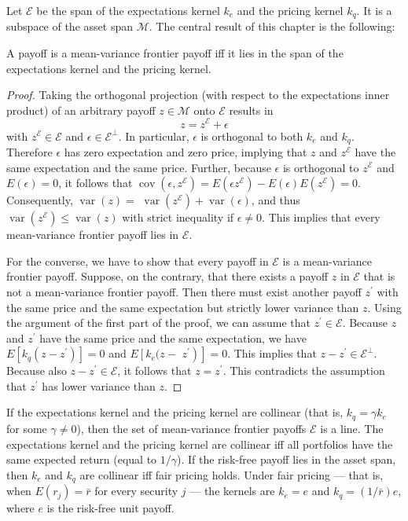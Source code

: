 \documentclass[\topdir/lecture\_notes.tex]{subfiles}
\begin{document}
Let $\mathcal{E}$ be the span of the expectations kernel $k_{e}$ and the pricing kernel $k_{q}$. It is a subspace of the asset span $\mathcal{M}$. The central result of this chapter is the following:

\begin{theorem} \label{thm:mean_variance_frontier_characterization} A payoff is a mean-variance frontier payoff iff it lies in the span of the expectations kernel and the pricing kernel.
\end{theorem}
\begin{proof}
Taking the orthogonal projection (with respect to the expectations inner product) of an arbitrary payoff $z \in \mathcal{M}$ onto $\mathcal{E}$ results in
\begin{equation*}
z=z^{\mathcal{E}}+\epsilon 
\end{equation*}
with $z^{\mathcal{E}} \in \mathcal{E}$ and $\epsilon \in \mathcal{E}^{\perp}$. In particular, $\epsilon$ is orthogonal to both $k_{e}$ and $k_{q}$. Therefore $\epsilon$ has zero expectation and zero price, implying that $z$ and $z^{\mathcal{E}}$ have the same expectation and the same price. Further, because $\epsilon$ is orthogonal to $z^{\mathcal{E}}$ and $E(\epsilon)=0$, it follows that $\operatorname{cov}\left(\epsilon, z^{\mathcal{E}}\right)=E\left(\epsilon z^{\mathcal{E}}\right)-E(\epsilon) E\left(z^{\mathcal{E}}\right)=0$. Consequently, $\operatorname{var}(z)=$ $\operatorname{var}\left(z^{\mathcal{E}}\right)+\operatorname{var}(\epsilon)$, and thus $\operatorname{var}\left(z^{\mathcal{E}}\right) \leq \operatorname{var}(z)$ with strict inequality if $\epsilon \neq 0$. This implies that every mean-variance frontier payoff lies in $\mathcal{E}$.

For the converse, we have to show that every payoff in $\mathcal{E}$ is a mean-variance frontier payoff. Suppose, on the contrary, that there exists a payoff $z$ in $\mathcal{E}$ that is not a mean-variance frontier payoff. Then there must exist another payoff $z^{\prime}$ with the same price and the same expectation but strictly lower variance than $z$. Using the argument of the first part of the proof, we can assume that $z^{\prime} \in \mathcal{E}$. Because $z$ and $z^{\prime}$ have the same price and the same expectation, we have $E\left[k_{q}\left(z-z^{\prime}\right)\right]=0$ and $E\left[k_{e}(z-\right.$ $\left.\left.z^{\prime}\right)\right]=0$. This implies that $z-z^{\prime} \in \mathcal{E}^{\perp}$. Because also $z-z^{\prime} \in \mathcal{E}$, it follows that $z=z^{\prime}$. This contradicts the assumption that $z^{\prime}$ has lower variance than $z$.
\end{proof}
If the expectations kernel and the pricing kernel are collinear (that is, $k_{q}=\gamma k_{e}$ for some $\gamma \neq 0$), then the set of mean-variance frontier payoffs $\mathcal{E}$ is a line. The expectations kernel and the pricing kernel are collinear iff all portfolios have the same expected return (equal to $1/\gamma$). If the risk-free payoff lies in the asset span, then $k_{e}$ and $k_{q}$ are collinear iff fair pricing holds. Under fair pricing --- that is, when $E\left(r_{j}\right)=\bar{r}$ for every security $j$ --- the kernels are $k_{e}=e$ and $k_{q}=(1/\bar{r}) e$, where $e$ is the risk-free unit payoff.
\end{document}
